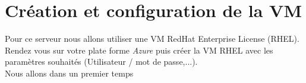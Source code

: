 \chapter{Création et configuration de la VM}


Pour ce serveur nous allons utiliser une VM RedHat Enterprise License (RHEL). Rendez vous sur votre plate forme \textit{Azure} puis créer la VM RHEL avec les paramètres souhaités (Utilisateur / mot de passe,...).\\

Nous allons dans un premier temps 